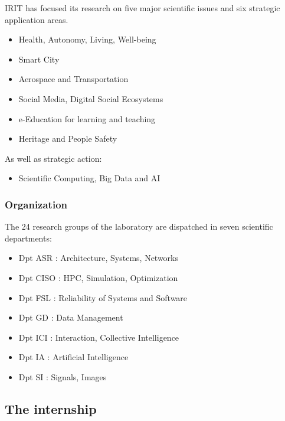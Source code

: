 \documentclass[
  a4paper, xcolor = usenames,dvipsnames]{article}
\providecommand{\tightlist}{%
  \setlength{\itemsep}{0pt}\setlength{\parskip}{0pt}}
\begin{document}
IRIT has focused its research on five major scientific issues and six strategic application areas.

\begin{itemize}
\tightlist
\item
  Health, Autonomy, Living, Well-being
\item
  Smart City
\item
  Aerospace and Transportation
\item
  Social Media, Digital Social Ecosystems
\item
  e-Education for learning and teaching
\item
  Heritage and People Safety
\end{itemize}

As well as strategic action:

\begin{itemize}
\tightlist
\item
  Scientific Computing, Big Data and AI
\end{itemize}

\hypertarget{organization}{%
\subsubsection{Organization}\label{organization}}

The 24 research groups of the laboratory are dispatched in seven scientific departments:

\begin{itemize}
\tightlist
\item
  Dpt ASR : Architecture, Systems, Networks
\item
  Dpt CISO : HPC, Simulation, Optimization
\item
  Dpt FSL : Reliability of Systems and Software
\item
  Dpt GD : Data Management
\item
  Dpt ICI : Interaction, Collective Intelligence
\item
  Dpt IA : Artificial Intelligence
\item
  Dpt SI : Signals, Images
\end{itemize}

\hypertarget{the-internship}{%
\subsection{The internship}\label{the-internship}}
\end{document}
